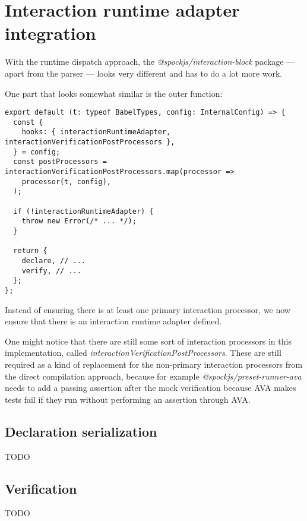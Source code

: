 \section{Interaction runtime adapter integration}
With the runtime dispatch approach,
the \textit{@spockjs/interaction-block} package
--- apart from the parser ---
looks very different and has to do a lot more work.

One part that looks somewhat similar is
the outer function:
\begin{verbatim}
export default (t: typeof BabelTypes, config: InternalConfig) => {
  const {
    hooks: { interactionRuntimeAdapter, interactionVerificationPostProcessors },
  } = config;
  const postProcessors = interactionVerificationPostProcessors.map(processor =>
    processor(t, config),
  );

  if (!interactionRuntimeAdapter) {
    throw new Error(/* ... */);
  }

  return {
    declare, // ...
    verify, // ...
  };
};
\end{verbatim}
Instead of ensuring there is at least one primary interaction processor,
we now ensure that there is an interaction runtime adapter defined.

One might notice that there are still some sort of interaction processors
in this implementation, called \textit{interactionVerificationPostProcessors}.
These are still required as a kind of replacement for
the non-primary interaction processors from the direct compilation approach,
because for example \textit{@spockjs/preset-runner-ava} needs to
add a passing assertion after the mock verification
because AVA makes tests fail if they run without performing an assertion through AVA.

\subsection{Declaration serialization}
TODO

\subsection{Verification}
TODO
